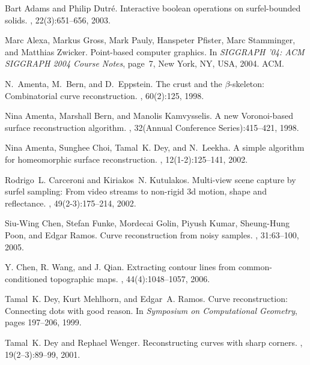 \documentclass{article}
\numberwithin{cntr}{section}
\numberwithin{equation}{section}
\begin{document}

\begin{thebibliography}{99}

Bart Adams and Philip Dutr\'{e}.
\newblock Interactive boolean operations on surfel-bounded solids.
, 22(3):651--656, 2003.

Marc Alexa, Markus Gross, Mark Pauly, Hanspeter Pfister, Marc Stamminger, and
  Matthias Zwicker.
\newblock Point-based computer graphics.
\newblock In {\em SIGGRAPH '04: ACM SIGGRAPH 2004 Course Notes}, page~7, New
  York, NY, USA, 2004. ACM.

N.~Amenta, M.~Bern, and D.~Eppstein.
\newblock The crust and the $\beta$-skeleton: Combinatorial curve
  reconstruction.
, 60(2):125, 1998.

Nina Amenta, Marshall Bern, and Manolis Kamvysselis.
\newblock A new {Voronoi}-based surface reconstruction algorithm.
, 32({Annual Conference Series}):415--421,
  1998.

Nina Amenta, Sunghee Choi, Tamal~K. Dey, and N.~Leekha.
\newblock A simple algorithm for homeomorphic surface reconstruction.
, 12(1-2):125--141, 2002.

Rodrigo~L. Carceroni and Kiriakos~N. Kutulakos.
\newblock Multi-view scene capture by surfel sampling: From video streams to
  non-rigid 3d motion, shape and reflectance.
, 49(2-3):175--214, 2002.

Siu-Wing Chen, Stefan Funke, Mordecai Golin, Piyush Kumar,
Sheung-Hung Poon, and Edgar Ramos.
\newblock Curve reconstruction from noisy samples.
, 31:63--100, 2005.

Y. Chen, R. Wang, and J. Qian. 
\newblock Extracting contour lines from common-conditioned topographic maps. 
, 
44(4):1048--1057, 2006.

Tamal~K. Dey, Kurt Mehlhorn, and Edgar~A. Ramos.
\newblock Curve reconstruction: Connecting dots with good reason.
\newblock In {\em Symposium on Computational Geometry}, pages 197--206, 1999.

Tamal~K. Dey and Rephael Wenger.
\newblock Reconstructing curves with sharp corners.
, 19(2--3):89--99, 2001.


\end{thebibliography}
\end{document}
